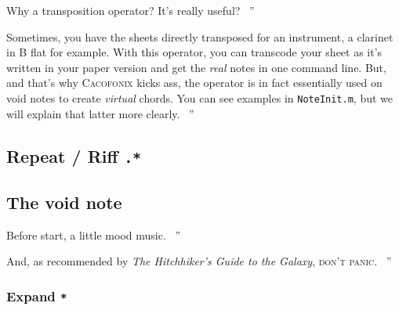 \documentclass{article}
\newcommand\cacofonix{\textsc{Cacofonix}\xspace}
\newcommand\noteInitFile{\texttt{NoteInit.m}\xspace}
\newenvironment{meenv}{ \par \noindent \makebox[6em][r]{ \textcolor{mecolor}{Me}: `` --~}}{~''}
\newenvironment{myselfenv}{ \par \noindent \makebox[6em][r]{ \textcolor{myselfcolor}{Myself}: `` --~}}{~''}
\newcommand{ \me }[1]{%
\begin{meenv}%
	#1%
\end{meenv} }
\newcommand{ \myself }[1]{%
\begin{myselfenv}%
	#1%
\end{myselfenv} }
\begin{document}
\me{Why a transposition operator? It's really useful?}
\myself{Sometimes, you have the sheets directly transposed for an instrument, a clarinet in B flat for example. With this operator, you can transcode your sheet as it's written in your paper version and get the \emph{real} notes in one command line. But, and that's why \cacofonix kicks ass, the operator is in fact essentially used on void notes to create \emph{virtual} chords. You can see examples in \noteInitFile, but we will explain that latter more clearly.}

\subsection{Repeat / Riff \lstinline!.*!}
\label{sec:RepeatRiff}

\subsection{The void note}
\label{sec:VoidNote}

\me{Before start, a little mood music.}

\vspace{ 0.25in }

\begin{center}
\end{center}

\vspace{ 0.25in }

\myself{And, as recommended by \emph{The Hitchhiker's Guide to the Galaxy}, \textsc{don't panic}. \rightthumbsup}

\subsubsection{Expand \lstinline!*!}
\label{sec:Expand}
\end{document}

